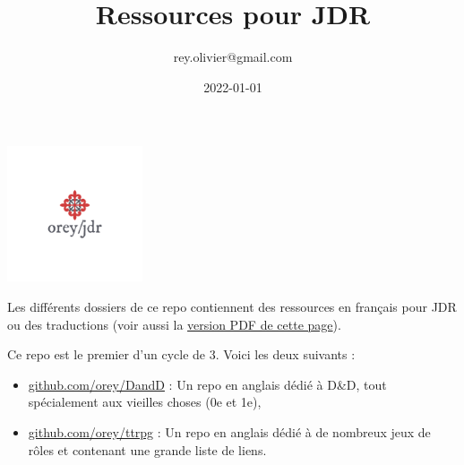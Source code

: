 \documentclass[a4paper, 11pt, twoside]{article}
\author{rey.olivier@gmail.com}
\date{2022-01-01}
\title{Ressources pour JDR}
\begin{document}
\maketitle
\tableofcontents

\begin{center}
\includegraphics[width=4cm]{logo-orey.png}
\end{center}

Les différents dossiers de ce repo contiennent des ressources en français pour JDR ou des traductions (voir aussi la \href{RessourcesPourJDR-ORey.pdf}{version PDF de cette page}).

Ce repo est le premier d'un cycle de 3. Voici les deux suivants :
\begin{itemize}
\item \href{https://github.com/orey/DandD}{github.com/orey/DandD} : Un repo en anglais dédié à D\&D, tout spécialement aux vieilles choses (0e et 1e),
\item \href{https://github.com/orey/ttrpg}{github.com/orey/ttrpg} : Un repo en anglais dédié à de nombreux jeux de rôles et contenant une grande liste de liens.
\end{itemize}
\end{document}
